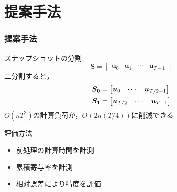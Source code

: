 \documentclass[aspectratio=169,dvipdfmx,hyperref={bookmarks=true}]{beamer}
\begin{document}
\section{提案手法}
\begin{frame}
\frametitle{提案手法}
\begin{block}{スナップショットの分割}
 \[ \bm{S} = 
        		\begin{bmatrix}
   \bm{u}_0 & \bm{u}_1 &\cdots  & \bm{u}_{T-1}
\end{bmatrix}
\]
二分割すると，
\begin{eqnarray}
	\bm{S_0} 		&= \begin{bmatrix}\bm{u}_0 &\cdots  & \bm{u}_{T/2-1}\end{bmatrix}\notag		\\
	\bm{S_1} 	&= \begin{bmatrix} \bm{u}_{T/2}  &\cdots  & \bm{u}_{T-1}\end{bmatrix}\notag	
\end{eqnarray}
$O(nT^2)$の計算負荷が，$O(2n(T/4))$に削減できる
\end{block}

\begin{block}{評価方法}
 	\begin{itemize}
	\item 前処理の計算時間を計測
	\item	累積寄与率を計測
	\item	相対誤差により精度を評価
	\end{itemize}
\end{block}


 \end{frame}

  
\end{document}
